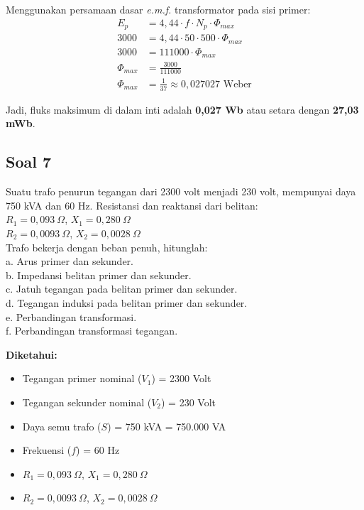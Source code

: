 \documentclass[12pt, a4paper]{article}
\begin{document}
\begin{enumerate}[label=\alph*.]
    Menggunakan persamaan dasar \textit{e.m.f.} transformator pada sisi primer:
    \begin{align*}
        E_p &= 4,44 \cdot f \cdot N_p \cdot \Phi_{max} \\
        3000 &= 4,44 \cdot 50 \cdot 500 \cdot \Phi_{max} \\
        3000 &= 111000 \cdot \Phi_{max} \\
        \Phi_{max} &= \frac{3000}{111000} \\
        \Phi_{max} &= \frac{1}{37} \approx 0,027027 \text{ Weber}
    \end{align*}

    Jadi, fluks maksimum di dalam inti adalah \textbf{0,027 Wb} atau setara dengan \textbf{27,03 mWb}.
\end{enumerate}

\subsection*{Soal 7}
Suatu trafo penurun tegangan dari 2300 volt menjadi 230 volt, mempunyai daya 750 kVA dan 60 Hz. Resistansi dan reaktansi dari belitan:\\
$R_1 = 0,093 \ \Omega$, $X_1 = 0,280 \ \Omega$\\
$R_2 = 0,0093 \ \Omega$, $X_2 = 0,0028 \ \Omega$\\
Trafo bekerja dengan beban penuh, hitunglah:\\
a. Arus primer dan sekunder.\\
b. Impedansi belitan primer dan sekunder.\\
c. Jatuh tegangan pada belitan primer dan sekunder.\\
d. Tegangan induksi pada belitan primer dan sekunder.\\
e. Perbandingan transformasi.\\
f. Perbandingan transformasi tegangan.

\textbf{Diketahui:}
\begin{itemize}
    \item Tegangan primer nominal ($V_1$) = 2300 Volt
    \item Tegangan sekunder nominal ($V_2$) = 230 Volt
    \item Daya semu trafo ($S$) = 750 kVA = 750.000 VA
    \item Frekuensi ($f$) = 60 Hz
    \item $R_1 = 0,093 \ \Omega$, $X_1 = 0,280 \ \Omega$
    \item $R_2 = 0,0093 \ \Omega$, $X_2 = 0,0028 \ \Omega$
\end{itemize}
\end{document}
